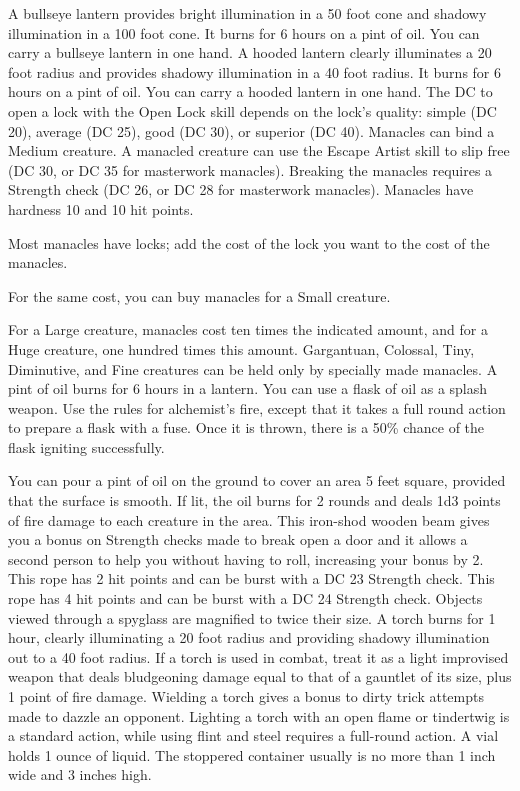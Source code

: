  A bullseye lantern provides bright illumination in a 50 foot cone and shadowy illumination in a 100 foot cone. It burns for 6 hours on a pint of oil. You can carry a bullseye lantern in one hand.
 A hooded lantern clearly illuminates a 20 foot radius and provides shadowy illumination in a 40 foot radius. It burns for 6 hours on a pint of oil. You can carry a hooded lantern in one hand.
 The DC to open a lock with the Open Lock skill depends on the lock's quality: simple (DC 20), average (DC 25), good (DC 30), or superior (DC 40).
 Manacles can bind a Medium creature. A manacled creature can use the Escape Artist skill to slip free (DC 30, or DC 35 for masterwork manacles). Breaking the manacles requires a Strength check (DC 26, or DC 28 for masterwork manacles). Manacles have hardness 10 and 10 hit points.
\par Most manacles have locks; add the cost of the lock you want to the cost of the manacles.
\par For the same cost, you can buy manacles for a Small creature.
\par For a Large creature, manacles cost ten times the indicated amount, and for a Huge creature, one hundred times this amount. Gargantuan, Colossal, Tiny, Diminutive, and Fine creatures can be held only by specially made manacles.
 A pint of oil burns for 6 hours in a lantern. You can use a flask of oil as a splash weapon. Use the rules for alchemist's fire, except that it takes a full round action to prepare a flask with a fuse. Once it is thrown, there is a 50\% chance of the flask igniting successfully.
\par You can pour a pint of oil on the ground to cover an area 5 feet square, provided that the surface is smooth. If lit, the oil burns for 2 rounds and deals 1d3 points of fire damage to each creature in the area.
 This iron-shod wooden beam gives you a  bonus on Strength checks made to break open a door and it allows a second person to help you without having to roll, increasing your bonus by 2.
 This rope has 2 hit points and can be burst with a DC 23 Strength check.
 This rope has 4 hit points and can be burst with a DC 24 Strength check.
 Objects viewed through a spyglass are magnified to twice their size.
 A torch burns for 1 hour, clearly illuminating a 20 foot radius and providing shadowy illumination out to a 40 foot radius. If a torch is used in combat, treat it as a light improvised weapon that deals bludgeoning damage equal to that of a gauntlet of its size, plus 1 point of fire damage. Wielding a torch gives a  bonus to dirty trick attempts made to dazzle an opponent. Lighting a torch with an open flame or tindertwig is a standard action, while using flint and steel requires a full-round action.
 A vial holds 1 ounce of liquid. The stoppered container usually is no more than 1 inch wide and 3 inches high.

